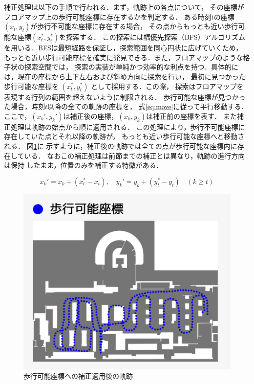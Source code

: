 補正処理は以下の手順で行われる．まず，軌跡上の各点について，
その座標がフロアマップ上の歩行可能座標に存在するかを判定する．
ある時刻$t$の座標$(x_t, y_t)$が歩行不可能な座標に存在する場合，
その点からもっとも近い歩行可能な座標$(x_t^*, y_t^*)$を探索する．
この探索には幅優先探索（BFS）アルゴリズムを用いる．BFSは最短経路を保証し，探索範囲を同心円状に広げていくため，
もっとも近い歩行可能座標を確実に発見できる．また，フロアマップのような格子状の探索空間では，
探索の実装が単純かつ効率的な利点を持つ．具体的には，現在の座標から上下左右および斜め方向に探索を行い，
最初に見つかった歩行可能な座標を $(x_t^*, y_t^*)$ として採用する．この際，
探索はフロアマップを表現する行列の範囲を超えないように制限される．
歩行可能な座標が見つかった場合，時刻$t$以降の全ての軌跡の座標を，
式\ref{eq:move}に従って平行移動する．
ここで，$(x_k', y_k')$は補正後の座標，$(x_k, y_k)$は補正前の座標を表す．
また補正処理は軌跡の始点から順に適用される．%
この処理により，歩行不可能座標に存在していた点とそれ以降の軌跡が，
もっとも近い歩行可能な座標へと移動される．
図\ref{fig:walkable-points}に
示すように，補正後の軌跡では全ての点が歩行可能な座標内に存在している．
なおこの補正処理は前節までの補正とは異なり，軌跡の進行方向は保持
したまま，位置のみを補正する特徴がある．




\begin{equation}
  \label{eq:move}
x_k' = x_k + (x_t^* - x_t), \quad y_k' = y_k + (y_t^* - y_t) \quad (k \geq t)
\end{equation}


\begin{figure}[H]
    \centering
    \includegraphics[width=\linewidth]{../image/walkable-points.jpg}
    \caption{歩行可能座標への補正適用後の軌跡}    \label{fig:walkable-points}
\end{figure}
